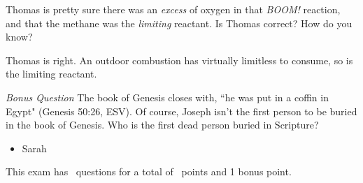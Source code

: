\documentclass[11pt,addpoints]{exam}   	%
\begin{document}
\begin{questions}
\question[3] Thomas is pretty sure there was an \emph{excess} of oxygen in that \emph{BOOM!} reaction, and that the methane was the \emph{limiting} reactant.
Is Thomas correct? How do you know?

\begin{solution}
Thomas is right. An outdoor combustion has virtually limitless  to consume, so  is the limiting reactant.
\end{solution}



\bonusquestion \emph{Bonus Question} 
The book of Genesis closes with, ``he was put in a coffin in Egypt" (Genesis 50:26, ESV).
Of course, Joseph isn't the first person to be buried in the book of Genesis.
Who is the first dead person buried in Scripture?
\begin{solution}
\begin{itemize}
\item Sarah
\end{itemize}
\end{solution}

\end{questions}

\begin{center}
This exam has \numquestions\ questions for a total of \numpoints\ points and 1 bonus point.
\end{center}

\pagebreak
\end{document}

